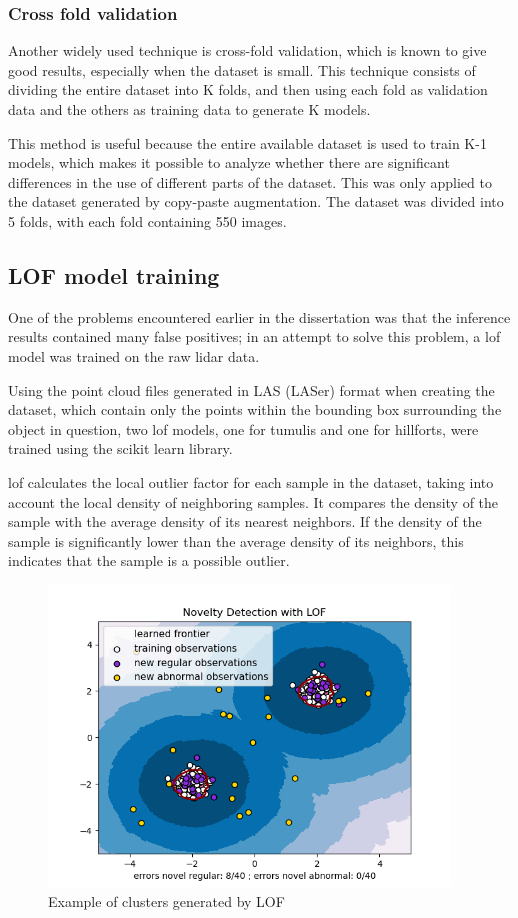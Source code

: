 \subsubsection{Cross fold validation}
Another widely used technique is cross-fold validation, which is known to give good results, especially when the dataset is small. This technique consists of dividing the entire dataset into K folds, and then using each fold as validation data and the others as training data to generate K models.

This method is useful because the entire available dataset is used to train K-1 models, which makes it possible to analyze whether there are significant differences in the use of different parts of the dataset.
This was only applied to the dataset generated by copy-paste augmentation. The dataset was divided into 5 folds, with each fold containing 550 images.

\subsection{LOF model training}
One of the problems encountered earlier in the dissertation was that the inference results contained many false positives; in an attempt to solve this problem, a \ac{lof} model was trained on the raw \ac{lidar} data.

Using the point cloud files generated in LAS (LASer) format when creating the dataset, which contain only the points within the bounding box surrounding the object in question, two \ac{lof} models, one for tumulis and one for hillforts, were trained using the scikit learn library\cite{lof}.

\ac{lof} calculates the local outlier factor for each sample in the dataset, taking into account the local density of neighboring samples. It compares the density of the sample with the average density of its nearest neighbors. If the density of the sample is significantly lower than the average density of its neighbors, this indicates that the sample is a possible outlier.

\begin{figure}[H]
\centering
\includegraphics[height=8cm]{images/lof_example.png}
\caption[Example of clusters generated by LOF]{Example of clusters generated by LOF\cite{lof}}
\end{figure}

